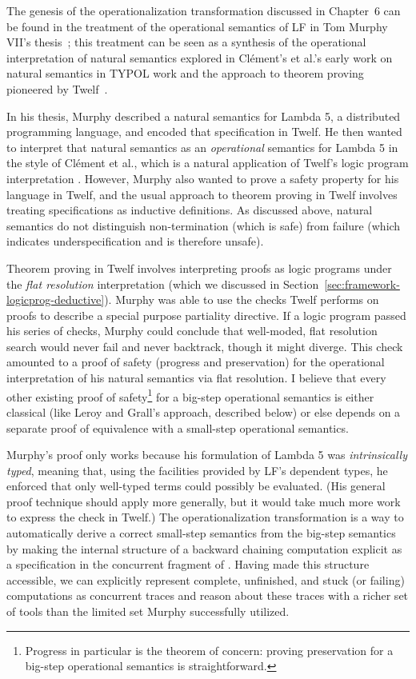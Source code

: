 The genesis of the operationalization transformation discussed in
Chapter~6 can be found in the treatment of the operational semantics
of LF in Tom Murphy VII's thesis~\cite{murphy08modal}; this treatment
can be seen as a synthesis of the operational interpretation of
natural semantics explored in Cl\'ement's et al.'s early work on
natural semantics in TYPOL work and the approach to theorem proving
pioneered by Twelf~\cite{pfenning99system}.

In his thesis, Murphy described a natural semantics for Lambda 5, a
distributed programming language, and encoded that specification in
Twelf. He then wanted to interpret that natural semantics as an {\it
  operational} semantics for Lambda 5 in the style of Cl\'ement et
al., which is a natural application of Twelf's logic program
interpretation \cite{michaylov91natural}.  However, Murphy also wanted
to prove a safety property for his language in Twelf, and the usual
approach to theorem proving in Twelf involves treating specifications
as inductive definitions. As discussed above, natural semantics do not
distinguish non-termination (which is safe) from failure (which
indicates underspecification and is therefore unsafe).

Theorem proving in Twelf involves interpreting proofs as logic
programs under the {\it flat resolution} interpretation (which we
discussed in Section~\ref{sec:framework-logicprog-deductive}).  Murphy
was able to use the checks Twelf performs on proofs to describe a
special purpose partiality directive. If a logic program passed his
series of checks, Murphy could conclude that well-moded, flat
resolution search would never fail and never backtrack, though it
might diverge. This check amounted to a proof of safety (progress and
preservation) for the operational interpretation of his natural
semantics via flat resolution. I believe that every other existing
proof of safety\footnote{Progress in particular is the theorem of
  concern: proving preservation for a big-step operational semantics
  is straightforward.} for a big-step operational semantics is either
classical (like Leroy and Grall's approach, described below) or else
depends on a separate proof of equivalence with a small-step
operational semantics.

Murphy's proof only works because his formulation of Lambda 5 was {\it
  intrinsically typed}, meaning that, using the facilities provided by
LF's dependent types, he enforced that only well-typed terms could
possibly be evaluated. (His general proof technique should apply more
generally, but it would take much more work to express the check in
Twelf.)  The operationalization transformation is a way to
automatically derive a correct small-step semantics from the big-step
semantics by making the internal structure of a backward chaining
computation explicit as a specification in the concurrent fragment of
\sls. Having made this structure accessible, we can explicitly
represent complete, unfinished, and stuck (or failing) computations as
concurrent traces and reason about these traces with a richer set of
tools than the limited set Murphy successfully utilized.

